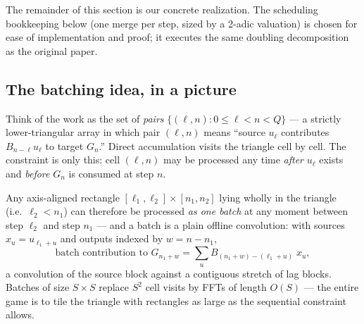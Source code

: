 \documentclass[11pt]{article}
\begin{document}
The remainder of this section is our concrete realization. The
scheduling bookkeeping below (one merge per step, sized by a 2-adic
valuation) is chosen for ease of implementation and proof; it executes
the same doubling decomposition as the original paper.

\subsection{The batching idea, in a picture}
\label{sec:picture}

Think of the work as the set of \emph{pairs}
$\{(\ell,n): 0\le\ell<n<Q\}$ --- a strictly lower-triangular array in
which pair $(\ell,n)$ means ``source $u_\ell$ contributes
$B_{n-\ell}u_\ell$ to target $G_n$.'' Direct accumulation visits the
triangle cell by cell. The constraint is only this: cell $(\ell,n)$ may
be processed any time \emph{after} $u_\ell$ exists and \emph{before}
$G_n$ is consumed at step $n$.

Any axis-aligned rectangle $[\ell_1,\ell_2]\times[n_1,n_2]$ lying
wholly in the triangle (i.e.\ $\ell_2 < n_1$) can therefore be
processed \emph{as one batch} at any moment between step $\ell_2$ and
step $n_1$ --- and a batch is a plain offline convolution: with sources
$x_u = u_{\ell_1+u}$ and outputs indexed by $w = n-n_1$,
\[
\text{batch contribution to } G_{n_1+w}
= \sum_{u} B_{(n_1+w)-(\ell_1+u)}\;x_u ,
\]
a convolution of the source block against a contiguous stretch of lag
blocks. Batches of size $S\times S$ replace $S^2$ cell visits by
FFTs of length $O(S)$ --- the entire game is to tile the triangle with
rectangles as large as the sequential constraint allows.
\end{document}
